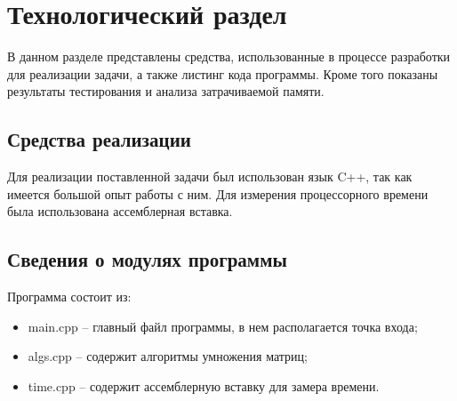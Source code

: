 \chapter{Технологический раздел}
\label{cha:technological}

    В данном разделе представлены средства, использованные в процессе разработки для реализации задачи, а также листинг кода программы. Кроме того показаны результаты тестирования и анализа затрачиваемой памяти.

    \section{Средства реализации}
        Для реализации поставленной задачи был использован язык C++, так как имеется большой опыт работы с ним. Для измерения процессорного времени была использована ассемблерная вставка. 

    \section{Сведения о модулях программы}
    \par Программа состоит из:
    \begin{itemize}
        \item main.cpp -- главный файл программы, в нем располагается точка входа;
        \item algs.cpp -- содержит алгоритмы умножения матриц;
        \item time.cpp -- содержит ассемблерную вставку для замера времени.
    \end{itemize}

